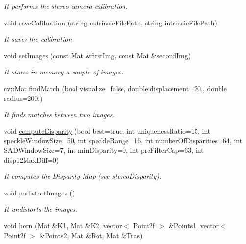 \begin{DoxyCompactItemize}
\begin{DoxyCompactList}\small\item\em It performs the stereo camera calibration. \end{DoxyCompactList}\item 
void \mbox{\hyperlink{classStereoCamera_a9f06cd4b170ad0ba45b681ee93d64851}{save\+Calibration}} (string extrinsic\+File\+Path, string intrinsic\+File\+Path)
\begin{DoxyCompactList}\small\item\em It saves the calibration. \end{DoxyCompactList}\item 
void \mbox{\hyperlink{classStereoCamera_adc36a2585c583219bddbb1c7fb0725df}{set\+Images}} (const Mat \&first\+Img, const Mat \&second\+Img)
\begin{DoxyCompactList}\small\item\em It stores in memory a couple of images. \end{DoxyCompactList}\item 
cv\+::\+Mat \mbox{\hyperlink{classStereoCamera_aeb1cf4e41058cd70c7df6b8c2511548d}{find\+Match}} (bool visualize=false, double displacement=20., double radius=200.)
\begin{DoxyCompactList}\small\item\em It finds matches between two images. \end{DoxyCompactList}\item 
void \mbox{\hyperlink{classStereoCamera_a79e986f2970bb2c5b5acd1ede65984aa}{compute\+Disparity}} (bool best=true, int uniqueness\+Ratio=15, int speckle\+Window\+Size=50, int speckle\+Range=16, int number\+Of\+Disparities=64, int S\+A\+D\+Window\+Size=7, int min\+Disparity=0, int pre\+Filter\+Cap=63, int disp12\+Max\+Diff=0)
\begin{DoxyCompactList}\small\item\em It computes the Disparity Map (see stereo\+Disparity). \end{DoxyCompactList}\item 
void \mbox{\hyperlink{classStereoCamera_a2751f357e5fabc7099303d45425208d7}{undistort\+Images}} ()
\begin{DoxyCompactList}\small\item\em It undistorts the images. \end{DoxyCompactList}\item 
void \mbox{\hyperlink{classStereoCamera_adf155975709fdbf09d3133899d074a02}{horn}} (Mat \&K1, Mat \&K2, vector$<$ Point2f $>$ \&Points1, vector$<$ Point2f $>$ \&Points2, Mat \&Rot, Mat \&Tras)

\end{DoxyCompactItemize}
